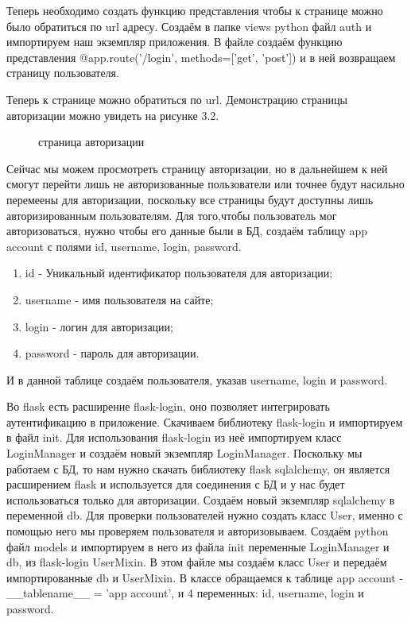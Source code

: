 \documentclass[12pt, oldlfont, amsfonts]{report}
\begin{document}
Теперь необходимо создать функцию представления чтобы к странице можно было обратиться по {url} адресу. Создаём в папке { views} python файл { auth} и импортируем наш экземпляр приложения. В файле создаём функцию представления { @app.route('/login', methods=['get', 'post'])} и в ней возвращаем страницу пользователя.

Теперь к странице можно обратиться по { url}. Демонстрацию страницы авторизации можно увидеть на рисунке 3.2.
\begin{figure}[h!]
\caption{страница авторизации}
\end{figure}

Сейчас мы можем просмотреть страницу авторизации, но в дальнейшем к ней смогут перейти лишь не авторизованные пользователи или точнее будут насильно перемеены для авторизации, поскольку все страницы будут доступны лишь авторизированным пользователям. Для того,чтобы пользователь мог авторизоваться, нужно чтобы его данные были в БД, создаём таблицу { app account} с полями { id}, { username}, { login}, { password}.

\begin{enumerate}
\item { id} - Уникальный идентификатор пользователя для авторизации;
\item { username} - имя пользователя на сайте;
\item { login} - логин для авторизации;
\item { password} - пароль для авторизации.
\end{enumerate}

И в данной таблице создаём пользователя, указав { username}, { login} и { password}.

Во flask есть расширение { flask-login}, оно позволяет интегрировать аутентификацию в приложение. Скачиваем библиотеку { flask-login} и импортируем в файл { init}. Для использования flask-login из неё импортируем класс { LoginManager} и создаём новый экземпляр { LoginManager}. Поскольку мы работаем с БД, то нам нужно скачать библиотеку { flask sqlalchemy}, он является расширением flask и используется для соединения с БД и у нас будет использоваться только для авторизации. Создаём новый экземпляр { sqlalchemy} в переменной { db}. Для проверки пользователей нужно создать класс { User}, именно с помощью него мы проверяем пользователя и авторизовываем. Создаём python файл { models} и импортируем в него из файла { init} переменные { LoginManager} и { db}, из { flask-login} { UserMixin}. В этом файле мы создаём класс { User} и передаём импортированные { db} и { UserMixin}. В классе обращаемся к таблице { app account} - { \_\_tablename\_\_ = 'app account'}, и 4 переменных: { id}, { username}, { login} и { password}.
\end{document}
